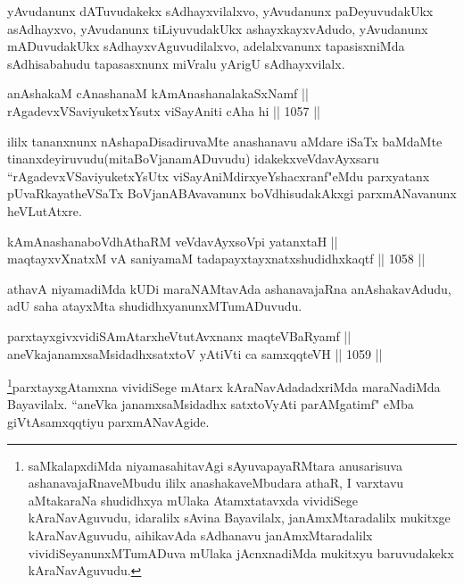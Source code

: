\begin{artha}
yAvudanunx dATuvudakekx sAdhayxvilalxvo, yAvudanunx paDeyuvudakUkx asAdhayxvo, yAvudanunx tiLiyuvudakUkx ashayxkayxvAdudo, yAvudanunx mADuvudakUkx sAdhayxvAguvudilalxvo, adelalxvanunx tapasisxniMda sAdhisabahudu tapasasxnunx miVralu yArigU sAdhayxvilalx.
\end{artha}


\begin{shl}
anAshakaM cAnashanaM kAmAnashanalakaSxNamf ||  \\
rAgadevxVSaviyuketxYsutx viSayAniti cA\s \s ha hi \hfill || 1057 ||  
\end{shl}
				
\begin{artha}
ililx tananxnunx nAshapaDisadiruvaMte anashanavu aMdare iSaTx baMdaMte tinanxdeyiruvudu(mitaBoVjanamADuvudu) idakekx\break veVdavAyxsaru ``rAgadevxVSaviyuketxYsUtx viSayAniMdirxyeYshacxranf"\break eMdu parxyatanx pUvaRkayatheVSaTx BoVjanABAvavanunx boVdhisudakAkxgi parxmANavanunx heVLutAtxre.
\end{artha}				
				
\begin{shl}
kAmAnashanaboVdhAthaRM veVdavAyxsoV\s pi yatanxtaH || \\
maqtayxvXnatxM vA saniyamaM tadapayxtayxnatxshudidhxkaqtf \hfill || 1058 ||  
\end{shl}

\begin{artha}
athavA niyamadiMda kUDi maraNAMtavAda ashanavajaRna anAshakavAdudu, adU saha atayxMta shudidhxyanunxMTumADuvudu.
\end{artha}

\begin{shl}
parxtayxgivxvidiSAmAtarxheVtutAvxnanx maqteVBaRyamf ||  \\
aneVkajanamxsaMsidadhxsatxtoV yAtiVti ca samxqqteVH \hfill || 1059 ||  
\end{shl}

\begin{artha}
\footnote{saMkalapxdiMda niyamasahitavAgi sAyuvapayaRMtara anusarisuva ashanavajaRnaveMbudu ililx anashakaveMbudara athaR, I varxtavu aMtakaraNa shudidhxya mUlaka Atamxtatavxda vividiSege kAraNavAguvudu, idaralilx sAvina Bayavilalx, janAmxMtaradalilx mukitxge kAraNavAguvudu, aihikavAda sAdhanavu janAmxMtaradalilx vividiSeyanunxMTumADuva mUlaka jAcnxnadiMda mukitxyu baruvudakekx kAraNavAguvudu.}parxtayxgAtamxna vividiSege mAtarx kAraNavAdadadxriMda maraNadiMda Bayavilalx. ``aneVka janamxsaMsidadhx satxtoVyAti parAMgatimf" eMba giVtAsamxqqtiyu parxmANavAgide.
\end{artha}

